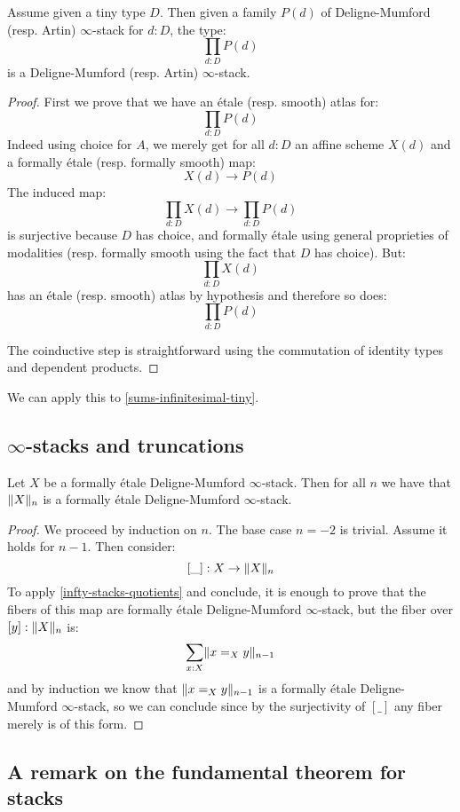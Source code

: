 \begin{lemma}
Assume given a tiny type $D$. Then given a family $P(d)$ of Deligne-Mumford (resp. Artin) $\infty$-stack for $d:D$, the type:
\[\prod_{d:D}P(d)\]
is a Deligne-Mumford (resp. Artin) $\infty$-stack.
\end{lemma}

\begin{proof}
First we prove that we have an étale (resp. smooth) atlas for:
\[\prod_{d:D}P(d)\]
Indeed using choice for $A$, we merely get for all $d:D$ an affine scheme $X(d)$ and a formally étale (resp. formally smooth) map:
\[X(d)\to P(d)\]
The induced map:
\[\prod_{d:D}X(d) \to \prod_{d:D}P(d)\] 
is surjective because $D$ has choice, and formally étale using general proprieties of modalities (resp. formally smooth using the fact that $D$ has choice). But:
\[\prod_{d:D}X(d)\]
has an étale (resp. smooth) atlas by hypothesis and therefore so does:
\[\prod_{d:D}P(d)\]

The coinductive step is straightforward using the commutation of identity types and dependent products.
\end{proof}

We can apply this to \cref{sums-infinitesimal-tiny}.

\subsection{$\infty$-stacks and truncations}

\begin{proposition}
Let $X$ be a formally étale Deligne-Mumford $\infty$-stack. Then for all $n$ we have that $\lVert X \rVert_n$ is a formally étale Deligne-Mumford $\infty$-stack.
\end{proposition}

\begin{proof}
We proceed by induction on $n$. The base case $n=-2$ is trivial. Assume it holds for $n-1$. Then consider:
\[[\_] : X\to \lVert X \rVert_n\]
To apply \cref{infty-stacks-quotients} and conclude, it is enough to prove that the fibers of this map are formally étale Deligne-Mumford $\infty$-stack, but the fiber over $[y]:\lVert X \rVert_n$ is:
\[\sum_{x:X} \lVert x=_Xy \rVert_{n-1}\]
and by induction we know that $\lVert x=_Xy \rVert_{n-1}$ is a formally étale Deligne-Mumford $\infty$-stack, so we can conclude since by the surjectivity of $[\_]$ any fiber merely is of this form.
\end{proof}

\subsection{A remark on the fundamental theorem for stacks}

